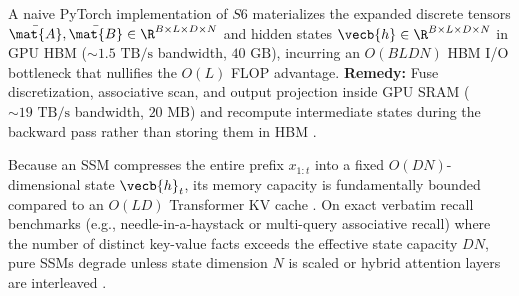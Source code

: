 \documentclass[../../../../master.tex]{subfiles}
\begin{document}
\begin{pitfall}
A naive PyTorch implementation of $S6$ materializes the expanded discrete tensors $\bar{\mat{A}}, \bar{\mat{B}} \in \R^{B \times L \times D \times N}$ and hidden states $\vecb{h} \in \R^{B \times L \times D \times N}$ in GPU HBM ($\sim 1.5\text{ TB/s}$ bandwidth, $40\text{ GB}$), incurring an $O(BLDN)$ HBM I/O bottleneck that nullifies the $O(L)$ FLOP advantage. \textbf{Remedy:} Fuse discretization, associative scan, and output projection inside GPU SRAM ($\sim 19\text{ TB/s}$ bandwidth, $20\text{ MB}$) and recompute intermediate states during the backward pass rather than storing them in HBM .
\end{pitfall}

\begin{pitfall}
Because an SSM compresses the entire prefix $x_{1:t}$ into a fixed $O(DN)$-dimensional state $\vecb{h}_t$, its memory capacity is fundamentally bounded compared to an $O(LD)$ Transformer KV cache . On exact verbatim recall benchmarks (e.g., needle-in-a-haystack or multi-query associative recall) where the number of distinct key-value facts exceeds the effective state capacity $DN$, pure SSMs degrade unless state dimension $N$ is scaled or hybrid attention layers are interleaved .
\end{pitfall}
\end{document}
